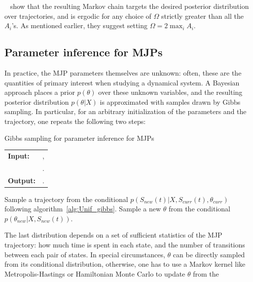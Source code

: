     ~\cite{RaoTeh12} show that the resulting Markov chain targets
    the desired posterior distribution over trajectories, and is 
    ergodic for any choice of $\Omega$ strictly greater than all the
    $A_i$'s. As mentioned earlier, they suggest setting $\Omega = 2\max_i A_i$.

\subsection{Parameter inference for MJPs}
In practice, the MJP parameters themselves are unknown: often,
these are the quantities of primary interest when studying a dynamical
system. A Bayesian approach
places a prior $p(\theta)$ over these unknown variables, and the
resulting posterior distribution $p(\theta|X)$ is approximated
with samples drawn by Gibbs sampling. In particular, for an arbitrary 
initialization of the parameters and the trajectory, one repeats the
following two steps:
\begin{algorithm}[H]
  \caption{Gibbs sampling for parameter inference for MJPs}
   \label{alg:MJP_gibbs}
  \begin{tabular}{l l}
   \textbf{Input:  } & \text{A set of partial and noisy observations $X$}, \\
                      & \text{The previous MJP path $S(t) = (S, T)$, the previous MJP parameters $\theta$}.\\ 
   \textbf{Output:  }& \text{A new MJP trajectory $\tilde{S} (t) = (\tilde{S}, \tilde{T})$, 
                            new MJP parameters $\tilde{\theta}$}.\\
   \hline
   \end{tabular}
   \begin{algorithmic}[1]
  \State  Sample a trajectory from the conditional 
  $p(S_{new}(t)|X,S_{curr}(t),\theta_{curr})$ following 
  algorithm~\ref{alg:Unif_gibbs}.
  \State Sample a new $\theta$ from the conditional 
    $p(\theta_{new}|X,S_{new}(t))$.
   \end{algorithmic}
\end{algorithm}
The last distribution depends on a set of sufficient statistics of the 
MJP trajectory: how
much time is spent in each state, and the number of transitions
between each pair of states. 
In special circumstances, $\theta$ can be directly sampled from its 
conditional distribution, otherwise, one has to use a Markov kernel like
Metropolis-Hastings or Hamiltonian Monte Carlo to update $\theta$ from the
